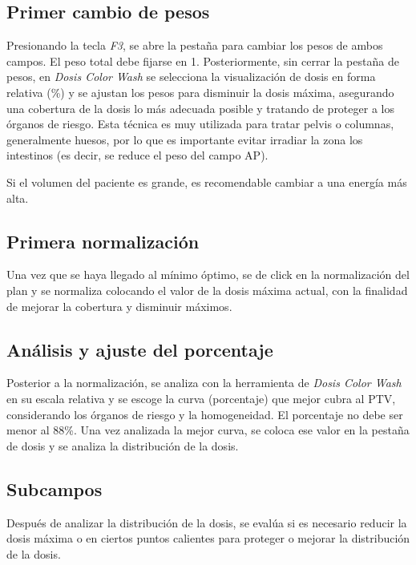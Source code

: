 \documentclass{article}
\begin{document}
\subsection{Primer cambio de pesos}

Presionando la tecla \textit{F3}, se abre la pestaña para cambiar los pesos de ambos campos. El peso total debe fijarse en 1. Posteriormente, sin cerrar la pestaña de pesos, en \textit{Dosis Color Wash} se selecciona la visualización de dosis en forma relativa (\%) y se ajustan los pesos para disminuir la dosis máxima, asegurando una cobertura de la dosis lo más adecuada posible y tratando de proteger a los órganos de riesgo. Esta técnica es muy utilizada para tratar pelvis o columnas, generalmente huesos, por lo que es importante evitar irradiar la zona los intestinos (es decir, se reduce el peso del campo AP).

Si el volumen del paciente es grande, es recomendable cambiar a una energía más alta.

\subsection{Primera normalización}

Una vez que se haya llegado al mínimo óptimo, se de click en la normalización del plan y se normaliza colocando el valor de la dosis máxima actual, con la finalidad de mejorar la cobertura y disminuir máximos.

\subsection{Análisis y ajuste del porcentaje}

Posterior a la normalización, se analiza con la herramienta de \textit{Dosis Color Wash} en su escala relativa y se escoge la curva (porcentaje) que mejor cubra al PTV, considerando los órganos de riesgo y la homogeneidad. El porcentaje no debe ser menor al 88\%. Una vez analizada la mejor curva, se coloca ese valor en la pestaña de dosis y se analiza la distribución de la dosis.

\subsection{Subcampos}

Después de analizar la distribución de la dosis, se evalúa si es necesario reducir la dosis máxima o en ciertos puntos calientes para proteger o mejorar la distribución de la dosis.
\end{document}
